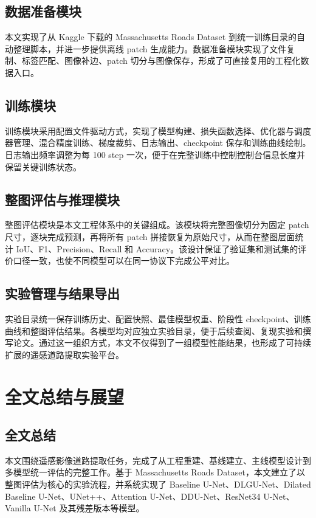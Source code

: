 \documentclass[12pt,a4paper]{ctexart}
\begin{document}
\subsection{数据准备模块}
本文实现了从 Kaggle 下载的 Massachusetts Roads Dataset 到统一训练目录的自动整理脚本，并进一步提供离线 patch 生成能力。数据准备模块实现了文件复制、标签匹配、图像补边、patch 切分与图像保存，形成了可直接复用的工程化数据入口。

\subsection{训练模块}
训练模块采用配置文件驱动方式，实现了模型构建、损失函数选择、优化器与调度器管理、混合精度训练、梯度裁剪、日志输出、checkpoint 保存和训练曲线绘制。日志输出频率调整为每 100 step 一次，便于在完整训练中控制控制台信息长度并保留关键训练状态。

\subsection{整图评估与推理模块}
整图评估模块是本文工程体系中的关键组成。该模块将完整图像切分为固定 patch 尺寸，逐块完成预测，再将所有 patch 拼接恢复为原始尺寸，从而在整图层面统计 IoU、F1、Precision、Recall 和 Accuracy。该设计保证了验证集和测试集的评价口径一致，也使不同模型可以在同一协议下完成公平对比。

\subsection{实验管理与结果导出}
实验目录统一保存训练历史、配置快照、最佳模型权重、阶段性 checkpoint、训练曲线和整图评估结果。各模型均对应独立实验目录，便于后续查阅、复现实验和撰写论文。通过这一组织方式，本文不仅得到了一组模型性能结果，也形成了可持续扩展的遥感道路提取实验平台。

\section{全文总结与展望}
\subsection{全文总结}
本文围绕遥感影像道路提取任务，完成了从工程重建、基线建立、主线模型设计到多模型统一评估的完整工作。基于 Massachusetts Roads Dataset，本文建立了以整图评估为核心的实验流程，并系统实现了 Baseline U-Net、DLGU-Net、Dilated Baseline U-Net、UNet++、Attention U-Net、DDU-Net、ResNet34 U-Net、Vanilla U-Net 及其残差版本等模型。
\end{document}
